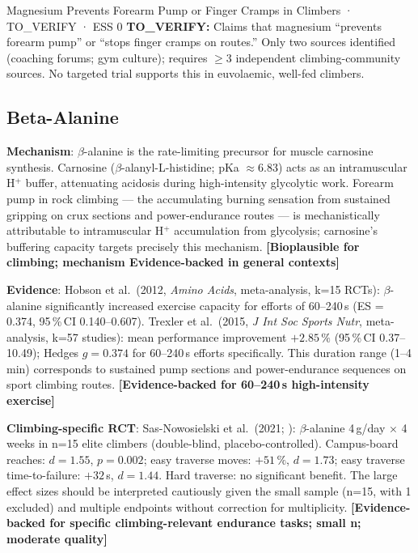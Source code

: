 \begin{toverifybox}{Magnesium Prevents Forearm Pump or Finger Cramps in Climbers · TO\_VERIFY · ESS 0}
\textbf{TO\_VERIFY:} Claims that magnesium ``prevents forearm pump'' or ``stops finger cramps on routes.'' Only two sources identified (coaching forums; gym culture); requires $\geq$3 independent climbing-community sources. No targeted trial supports this in euvolaemic, well-fed climbers.
\end{toverifybox}

\subsection{Beta-Alanine}
\label{subsec:betaalanine}

\textbf{Mechanism}: $\beta$-alanine is the rate-limiting precursor for muscle carnosine synthesis. Carnosine ($\beta$-alanyl-L-histidine; pKa ${\approx}$6.83) acts as an intramuscular H$^+$ buffer, attenuating acidosis during high-intensity glycolytic work. Forearm pump in rock climbing --- the accumulating burning sensation from sustained gripping on crux sections and power-endurance routes --- is mechanistically attributable to intramuscular H$^+$ accumulation from glycolysis; carnosine's buffering capacity targets precisely this mechanism. \textbf{[Bioplausible for climbing; mechanism Evidence-backed in general contexts]}

\textbf{Evidence}: Hobson et al.\ (2012, \textit{Amino Acids}, meta-analysis, k=15 RCTs): $\beta$-alanine significantly increased exercise capacity for efforts of 60--240\,s (ES = 0.374, 95\,\%\,CI 0.140--0.607). Trexler et al.\ (2015, \textit{J Int Soc Sports Nutr}, meta-analysis, k=57 studies): mean performance improvement $+2.85\,\%$ (95\,\%\,CI 0.37--10.49); Hedges $g = 0.374$ for 60--240\,s efforts specifically. This duration range (1--4\,min) corresponds to sustained pump sections and power-endurance sequences on sport climbing routes. \textbf{[Evidence-backed for 60--240\,s high-intensity exercise]}

\textbf{Climbing-specific RCT}: Sas-Nowosielski et al.\ (2021; \cite{SWK21}): $\beta$-alanine 4\,g/day $\times$ 4 weeks in n=15 elite climbers (double-blind, placebo-controlled). Campus-board reaches: $d{=}1.55$, $p{=}0.002$; easy traverse moves: $+51\,\%$, $d{=}1.73$; easy traverse time-to-failure: $+32$\,s, $d{=}1.44$. Hard traverse: no significant benefit. The large effect sizes should be interpreted cautiously given the small sample (n=15, with 1 excluded) and multiple endpoints without correction for multiplicity. \textbf{[Evidence-backed for specific climbing-relevant endurance tasks; small n; moderate quality]}

